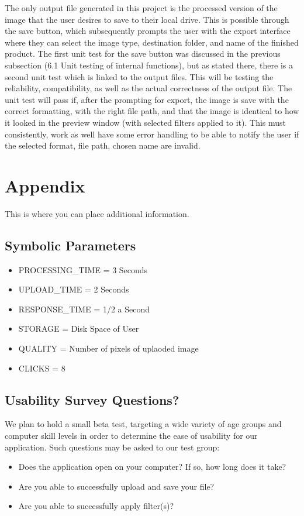 \documentclass[12pt, titlepage]{article}
\begin{document}
The only output file generated in this project is the processed version of the image that the user desires to save to their local drive. This is possible through the save button, which subsequently prompts the user with the export interface where they can select the image type, destination folder, and name of the finished product. The first unit test for the save button was discussed in the previous subsection (6.1 Unit testing of internal functions), but as stated there, there is a second unit test which is linked to the output files. This will be testing the reliability, compatibility, as well as the actual correctness of the output file. The unit test will pass if, after the prompting for export, the image is save with the correct formatting, with the right file path, and that the image is identical to how it looked in the preview window (with selected filters applied to it). This must consistently, work as well have some error handling to be able to notify the user if the selected format, file path, chosen name are invalid.	





\newpage

\section{Appendix}

This is where you can place additional information.

\subsection{Symbolic Parameters}

\begin{itemize}
\item PROCESSING\_TIME = 3 Seconds
\item UPLOAD\_TIME = 2 Seconds
\item RESPONSE\_TIME = 1/2 a Second
\item STORAGE = Disk Space of User
\item QUALITY = Number of pixels of uplaoded image
\item CLICKS = 8
\end{itemize}

\subsection{Usability Survey Questions?}

We plan to hold a small beta test, targeting a wide variety of age groups and computer skill levels in order to determine the ease of usability for our application.  Such questions may be asked to our test group:

\begin{itemize}
	\item Does the application open on your computer? If so, how long does it take?
	\item Are you able to successfully upload and save your file?
	\item Are you able to successfully apply filter(s)?
\end{itemize}
\end{document}
